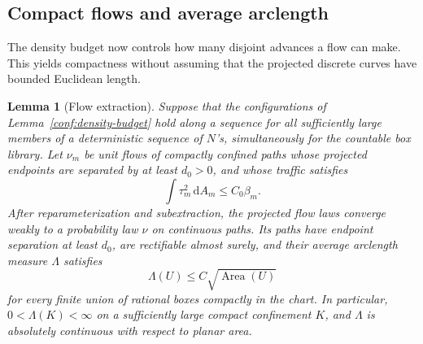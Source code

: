 \documentclass[11pt]{article}
\numberwithin{equation}{section}
\newtheorem{lemma}[theorem]{Lemma}
\theoremstyle{definition}
\theoremstyle{remark}
\newcommand{\dd}{\mathrm d}
\newcommand{\1}{\mathbf 1}
\DeclareMathOperator{\Area}{Area}
\begin{document}
\subsection{Compact flows and average arclength}
\label{conf:flows}

The density budget now controls how many disjoint advances a flow can
make.  This yields compactness without assuming that the projected
discrete curves have bounded Euclidean length.

\begin{lemma}[Flow extraction]
\label{conf:flow-compactness}
Suppose that the configurations of Lemma~\ref{conf:density-budget}
hold along a sequence for all sufficiently large members of a
deterministic sequence of \(N\)'s, simultaneously for the countable
box library.  Let \(\nu_m\) be unit flows of compactly confined paths
whose projected endpoints are separated by at least \(d_0>0\), and
whose traffic satisfies
\[
 \int\tau_m^2\,\dd A_m\le C_0\beta_m.
\]
After reparameterization and subextraction, the projected flow laws
converge weakly to a probability law \(\nu\) on continuous paths.
Its paths have endpoint separation at least \(d_0\), are rectifiable
almost surely, and their average arclength measure \(\Lambda\)
satisfies
\begin{equation}
 \Lambda(U)\le C\sqrt{\Area(U)}
 \label{conf:average-length}
\end{equation}
for every finite union of rational boxes compactly in the chart.
In particular, \(0<\Lambda(K)<\infty\) on a sufficiently large compact
confinement \(K\), and \(\Lambda\) is absolutely continuous with
respect to planar area.
\end{lemma}
\end{document}

